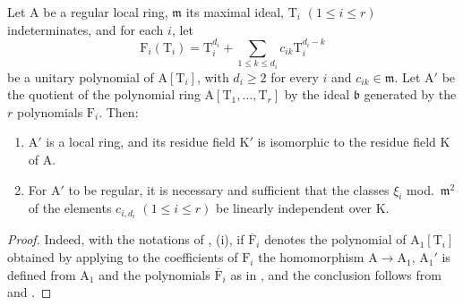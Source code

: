 \begin{corollary}[22.5.3]
\label{0.22.5.3}
Let $\mathrm{A}$ be a regular local ring, $\mathfrak{m}$ its maximal ideal, $\mathrm{T}_i$ $(1\leq i\leq r)$ indeterminates, and for each $i$, let
\[
\label{0.22.5.3.1}
  \mathrm{F}_i(\mathrm{T}_i)=\mathrm{T}_i^{d_i}+\sum_{1\leq k\leq d_i}c_{ik}\mathrm{T}_i^{d_i-k}
  \tag{22.5.3.1}
\]
be a unitary polynomial of $\mathrm{A}[\mathrm{T}_i]$, with $d_i\geq 2$ for every $i$ and $c_{ik}\in\mathfrak{m}$.
Let $\mathrm{A}'$ be the quotient of the polynomial ring $\mathrm{A}[\mathrm{T}_1,\ldots,\mathrm{T}_r]$ by the ideal $\mathfrak{b}$ generated by the $r$ polynomials $\mathrm{F}_i$.
Then:
\begin{enumerate}
  \item[\rm{(i)}] $\mathrm{A}'$ is a local ring, and its residue field $\mathrm{K}'$ is isomorphic to the residue field $\mathrm{K}$ of $\mathrm{A}$.
  \item[\rm{(ii)}] For $\mathrm{A}'$ to be regular, it is necessary and sufficient that the classes $\xi_i$ \textup{mod.}~$\mathfrak{m}^2$ of the elements $c_{i,d_i}$ $(1\leq i\leq r)$ be linearly independent over $\mathrm{K}$.
\end{enumerate}
\end{corollary}

\begin{proof}
Indeed, with the notations of , (i), if $\overline{\mathrm{F}}_i$ denotes the polynomial of $\mathrm{A}_1[\mathrm{T}_i]$ obtained by applying to the coefficients of $\mathrm{F}_i$ the homomorphism $\mathrm{A}\to\mathrm{A}_1$, $\mathrm{A}_1'$ is defined from $\mathrm{A}_1$ and the polynomials $\overline{\mathrm{F}}_i$ as in , and the conclusion follows from  and .
\end{proof}


